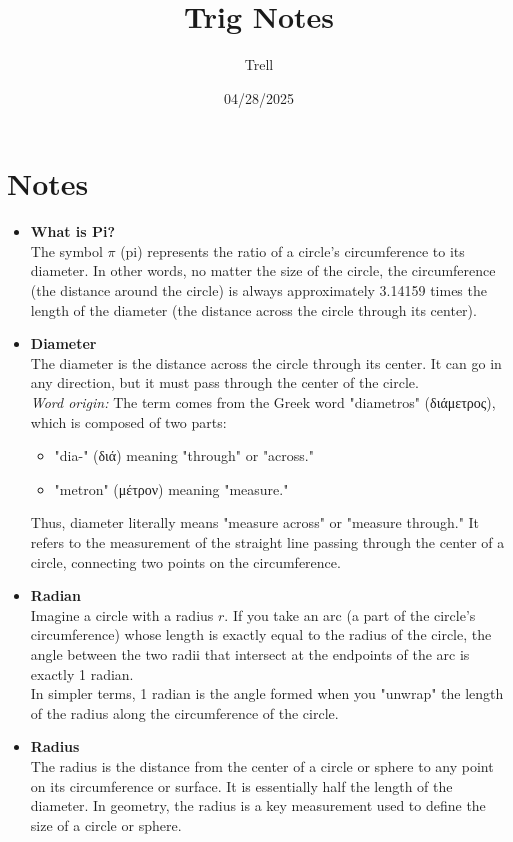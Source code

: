 \documentclass{article}
\title{Trig Notes}
\author{Trell}
\date{04/28/2025}  %
\begin{document}
\maketitle

\section{Notes}

\begin{itemize}
    \item \textbf{What is Pi?} \\
    The symbol \( \pi \) (pi) represents the ratio of a circle's circumference to its diameter. In other words, no matter the size of the circle, the circumference (the distance around the circle) is always approximately 3.14159 times the length of the diameter (the distance across the circle through its center).

    \item \textbf{Diameter} \\
    The diameter is the distance across the circle through its center. It can go in any direction, but it must pass through the center of the circle. \\
    \textit{Word origin:} The term comes from the Greek word "diametros" (διάμετρος), which is composed of two parts:
    \begin{itemize}
        \item "dia-" (διά) meaning "through" or "across."
        \item "metron" (μέτρον) meaning "measure."
    \end{itemize}
    Thus, diameter literally means "measure across" or "measure through." It refers to the measurement of the straight line passing through the center of a circle, connecting two points on the circumference.

    \item \textbf{Radian} \\
    Imagine a circle with a radius \( r \). If you take an arc (a part of the circle's circumference) whose length is exactly equal to the radius of the circle, the angle between the two radii that intersect at the endpoints of the arc is exactly 1 radian. \\
    In simpler terms, 1 radian is the angle formed when you "unwrap" the length of the radius along the circumference of the circle.

    \item \textbf{Radius} \\
    The radius is the distance from the center of a circle or sphere to any point on its circumference or surface. It is essentially half the length of the diameter. In geometry, the radius is a key measurement used to define the size of a circle or sphere.


\end{itemize}
\end{document}
